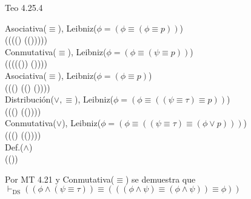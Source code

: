 \documentclass{article}
\begin{document}
\begin{logicenv}{Teo 4.25.4}
\begin{derivation}
        Asociativa($\equiv$), Leibniz($\phi = (\phi \equiv (\phi \equiv p))$)\\
            (\phi \equiv (\psi \equiv ((\phi \lor \psi) \equiv (\tau  \equiv (\phi \lor \psi)))))\\
        Conmutativa($\equiv$), Leibniz($\phi = (\phi \equiv (\psi \equiv p))$)\\
            (\phi \equiv (\psi \equiv ((\tau  \equiv (\phi \lor \psi)) \equiv (\phi \lor \psi))))\\
        Asociativa($\equiv$), Leibniz($\phi = (\phi \equiv p)$)\\
            (\phi \equiv ((\phi \equiv \tau) \equiv ((\phi \lor \tau) \equiv (\phi \lor \psi))))\\
        Distribución($\lor, \equiv$), Leibniz($\phi = (\phi \equiv ((\psi \equiv \tau)\equiv p))$)\\
            (\phi \equiv ((\psi \equiv \tau) \equiv (\phi \lor (\tau \equiv \psi))))\\
        Conmutativa($\lor$), Leibniz($\phi = (\phi \equiv ((\psi \equiv \tau) \equiv (\phi \lor p)))$)\\
            (\phi \equiv ((\psi \equiv \tau) \equiv (\phi \lor (\psi \equiv \tau))))\\
        Def.($\land$)\\
            (\phi \land (\psi \equiv \tau))
    \end{derivation}
    Por MT 4.21 y Conmutativa($\equiv$) se demuestra que\\
    $\vdash_{\text{DS}} ((\phi \land (\psi \equiv \tau)) \equiv (((\phi \land \psi) \equiv (\phi \land \psi)) \equiv \phi))$
\end{logicenv}
\end{document}
